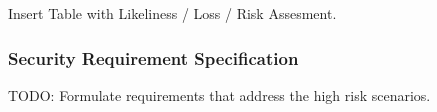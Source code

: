 Insert Table with Likeliness / Loss / Risk Assesment.

\subsubsection{Security Requirement Specification}
TODO: Formulate requirements that address the high risk scenarios.





